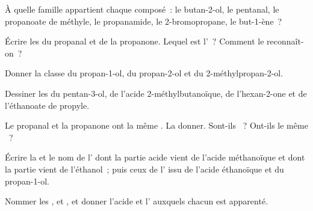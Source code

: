 \begin{exercise}[$\star$]\label{exo:g11:functional-groups:3}
À quelle famille appartient chaque composé~: le butan-2-ol, le pentanal,
le propanoate de méthyle, le propanamide, le 2-bromopropane, le
but-1-ène~?
\end{exercise}

\begin{exercise}[$\star$]\label{exo:g11:functional-groups:4}
Écrire les  du propanal et de la propanone.
Lequel est l'~? Comment le reconnaît-on~?
\end{exercise}

\begin{exercise}[$\star$]\label{exo:g11:functional-groups:5}
Donner la classe du propan-1-ol, du propan-2-ol et du
2-méthylpropan-2-ol.
\end{exercise}

\begin{exercise}[$\star\star$]\label{exo:g11:functional-groups:6}
Dessiner les  du pentan-3-ol, de l'acide
2-méthylbutanoïque, de l'hexan-2-one et de l'éthanoate de propyle.
\end{exercise}

\begin{exercise}[$\star\star$]\label{exo:g11:functional-groups:7}
Le propanal et la propanone ont la même . La donner. Sont-ils
~? Ont-ils le même ~?
\end{exercise}

\begin{exercise}[$\star\star$]\label{exo:g11:functional-groups:8}
Écrire la  et le nom de l' dont la partie
acide vient de l'acide méthanoïque  et dont la partie 
vient de l'éthanol~; puis ceux de l' issu de l'acide éthanoïque et
du propan-1-ol.
\end{exercise}

\begin{exercise}[$\star\star$]\label{exo:g11:functional-groups:9}
Nommer les  ,  et
, et donner l'acide et l' auxquels chacun est
apparenté.
\end{exercise}

